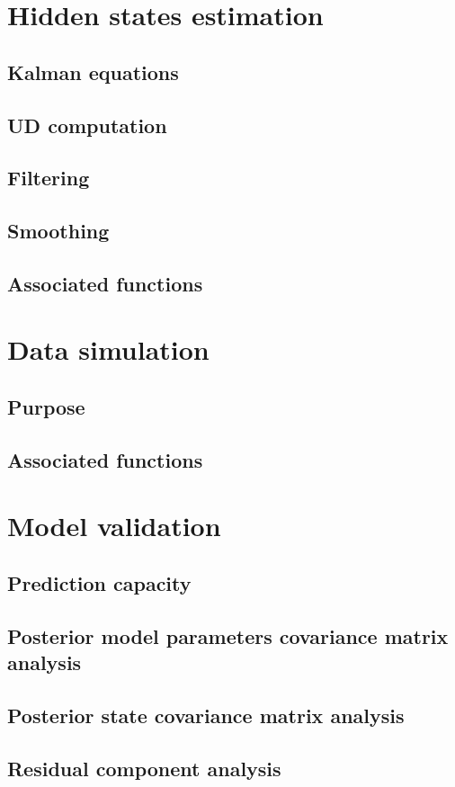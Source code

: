 \documentclass{book}
\begin{document}
\chapter{Hidden states estimation}
\section{Kalman equations}
\section{UD computation}
\section{Filtering}
\section{Smoothing}
\section{Associated functions}
\newpage

\chapter{Data simulation}
\section{Purpose}
\section{Associated functions}
\newpage

\chapter{Model validation}
\section{Prediction capacity}
\section{Posterior model parameters covariance matrix analysis}
\section{Posterior state covariance matrix analysis}
\section{Residual component analysis}
\end{document}
